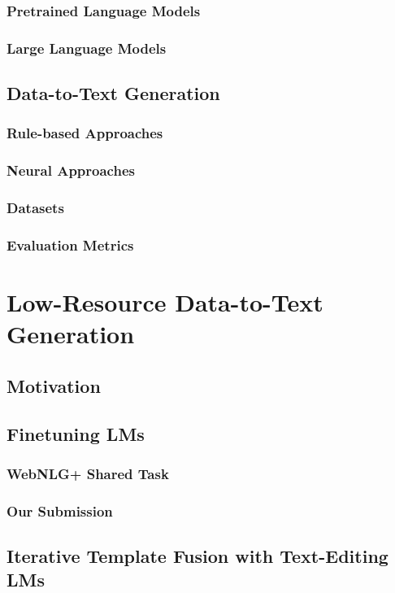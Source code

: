 \documentclass[12pt,notitlepage,a4paper,openright]{report}
\begin{document}
\subsection{Pretrained Language Models}
\label{sec:plms}
\subsection{Large Language Models}
\label{sec:llms}
\section{Data-to-Text Generation}
\label{sec:d2t}
\subsection{Rule-based Approaches}
\label{sec:rule-d2t}
\subsection{Neural Approaches}
\label{sec:neural-d2t}
\subsection{Datasets}
\label{sec:datasets}
\subsection{Evaluation Metrics}
\label{sec:evaluation}

\chapter{Low-Resource Data-to-Text Generation}
\label{chap:low-res}
\section{Motivation}
\label{sec:low-res-mot}
\section{Finetuning LMs}
\label{sec:finetuning}
\subsection{WebNLG+ Shared Task}
\label{sec:webnlgp}
\subsection{Our Submission}
\label{sec:mbart}
\section{Iterative Template Fusion with Text-Editing LMs}
\label{sec:iterative}
\end{document}
